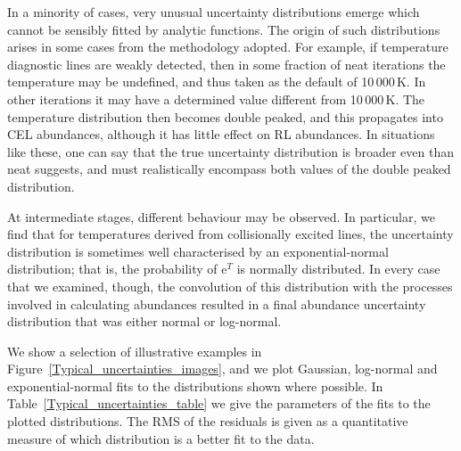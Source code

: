 \documentclass[useAMS,usenatbib]{mn2e}
\begin{document}
In a minority of cases, very unusual uncertainty distributions emerge which cannot be sensibly fitted by analytic functions.  The origin of such distributions arises in some cases from the methodology adopted.  For example, if temperature diagnostic lines are weakly detected, then in some fraction of {\sc neat} iterations the temperature may be undefined, and thus taken as the default of 10\,000\,K.  In other iterations it may have a determined value different from 10\,000\,K.  The temperature distribution then becomes double peaked, and this propagates into CEL abundances, although it has little effect on RL abundances.  In situations like these, one can say that the true uncertainty distribution is broader even than {\sc neat} suggests, and must realistically encompass both values of the double peaked distribution.

At intermediate stages, different behaviour may be observed.  In particular, we find that for temperatures derived from collisionally excited lines, the uncertainty distribution is sometimes well characterised by an exponential-normal distribution; that is, the probability of e$^T$ is normally distributed.  In every case that we examined, though, the convolution of this distribution with the processes involved in calculating abundances resulted in a final abundance uncertainty distribution that was either normal or log-normal.

We show a selection of illustrative examples in Figure~\ref{Typical_uncertainties_images}, and we plot Gaussian, log-normal and exponential-normal fits to the distributions shown where possible.  In Table~\ref{Typical_uncertainties_table} we give the parameters of the fits to the plotted distributions.  The RMS of the residuals is given as a quantitative measure of which distribution is a better fit to the data.
\end{document}

